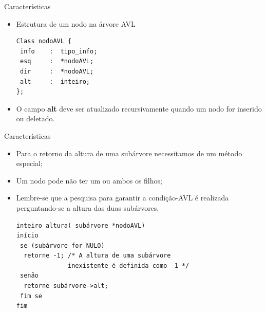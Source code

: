 \documentclass[12pt,table,xcolor={dvipsnames}]{beamer}
\begin{document}
\begin{frame}[fragile]{Características}
\begin{itemize}
\item Estrutura de um nodo na árvore AVL 
\begin{lstlisting}
Class nodoAVL {         
 info    :	tipo_info;
 esq     :	*nodoAVL;    
 dir     :	*nodoAVL;     
 alt     : 	inteiro; 
};
\end{lstlisting}
\item O campo \textbf{alt} deve ser atualizado recursivamente quando um nodo for inserido ou deletado.
\end{itemize}
\end{frame}

\begin{frame}[fragile]{Características}
\begin{itemize}
\item Para o retorno da altura de uma subárvore necessitamos de um método especial;
\item Um nodo pode não ter um ou ambos os filhos;
\item Lembre-se que a pesquisa para garantir a condição-AVL é realizada perguntando-se a altura das duas subárvores.
\begin{lstlisting}
inteiro altura( subárvore *nodoAVL) 
início                 
 se (subárvore for NULO)                         
  retorne -1; /* A altura de uma subárvore 
              inexistente é definida como -1 */
 senão                         
  retorne subárvore->alt;                 
 fim se         
fim
\end{lstlisting}
\end{itemize}
\end{frame}
\end{document}
